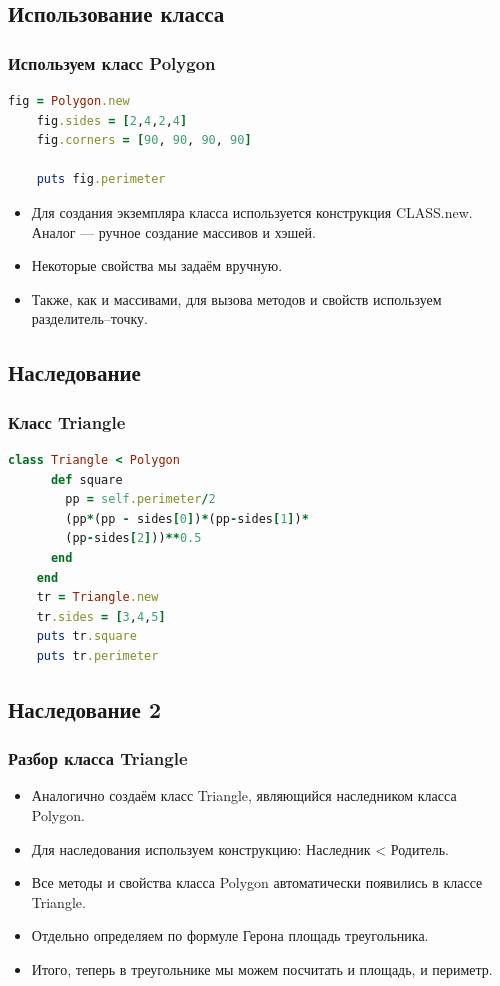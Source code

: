 \documentclass[compress,red]{beamer}
\begin{document}
\subsection{Использование класса}
\begin{frame}[fragile]
  \frametitle{Используем класс Polygon}
  \scriptsize{
  \begin{lstlisting}[language=ruby,basicstyle=\footnotesize,label=ruby2,caption=Использование Polygon]
    fig = Polygon.new
    fig.sides = [2,4,2,4]
    fig.corners = [90, 90, 90, 90]

    puts fig.perimeter
  \end{lstlisting}
  }
  \begin{itemize}
    \item Для создания экземпляра класса используется конструкция CLASS.new. Аналог --- ручное создание массивов и хэшей.
    \item Некоторые свойства мы задаём вручную.
    \item Также, как и массивами, для вызова методов и свойств используем разделитель--точку.
  \end{itemize}
\end{frame}

\subsection{Наследование}
\begin{frame}[fragile]
  \frametitle{Класс Triangle}
  \scriptsize{
  \begin{lstlisting}[language=ruby,basicstyle=\footnotesize,label=ruby3,caption=Класс Triangle]
    class Triangle < Polygon
      def square
        pp = self.perimeter/2
        (pp*(pp - sides[0])*(pp-sides[1])*
        (pp-sides[2]))**0.5
      end
    end
    tr = Triangle.new
    tr.sides = [3,4,5]
    puts tr.square
    puts tr.perimeter
  \end{lstlisting}
  }
\end{frame}

\subsection{Наследование 2}
\begin{frame}[fragile]
  \frametitle{Разбор класса Triangle}
  \begin{itemize}
    \item Аналогично создаём класс Triangle, являющийся наследником класса Polygon.
    \item Для наследования используем конструкцию: Наследник < Родитель.
    \item Все методы и свойства класса Polygon автоматически появились в классе Triangle.
    \item Отдельно определяем по формуле Герона площадь треугольника.
    \item Итого, теперь в треугольнике мы можем посчитать и площадь, и периметр.
  \end{itemize}
\end{frame}
\end{document}
